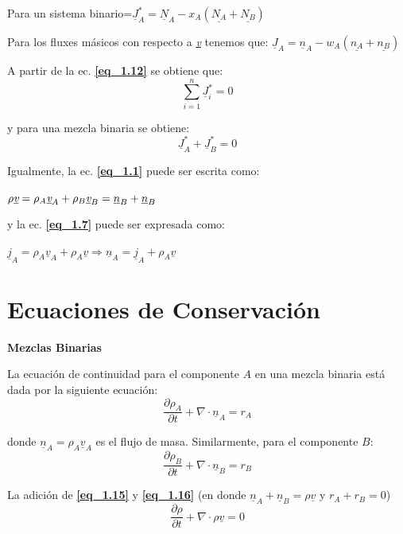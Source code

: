  Para un sistema binario=$\underline{J}_A^*=\underline{N}_A-x_A (\underline{N_A}+\underline{N_B})$
 
 Para los fluxes másicos con respecto a \underline{\emph{v}} tenemos que: $\underline{J}_A=\underline{n}_A-w_A (\underline{n_A}+\underline{n_B})$

 A partir de la ec. \textbf{\eqref{eq_1.12}} se obtiene que:
 \begin{equation}
 	\sum_{i=1}^n \underline{J}_i^* =0 \tag{1.13}\label{eq_1.13}
 \end{equation}
 
 y para una mezcla binaria se obtiene:
 \begin{equation}
 	\underline{J}_A^* + \underline{J}_B^* = 0 \tag{1.14}\label{eq_1.14}
 \end{equation}
 
 Igualmente, la ec. \textbf{\eqref{eq_1.1}} puede ser escrita como:	
 
$\rho \underline{\emph{v}}=\rho_A \underline{\emph{v}}_A+\rho_B \underline{\emph{v}}_B=\underline{n}_B+\underline{n}_B$
 
 y la ec. \textbf{\eqref{eq_1.7}} puede ser expresada como:
 
 $ \underline{j}_A=	\rho_A \underline{v}_A + \rho_A \underline{v} \Rightarrow \underline{n}_A = \underline{j}_A + \rho_A \underline{v} $
 
 \section{Ecuaciones de Conservación}
 \textbf{Mezclas Binarias}
 
 La ecuación de continuidad para el componente $A$ en una mezcla binaria está dada por la siguiente ecuación:
 \begin{equation}
 	\frac{\partial \rho_A}{\partial t} + \nabla \cdot \underline{n}_A = r_A \tag{1.15}\label{eq_1.15}
 \end{equation}
 
 donde $\underline{n}_A=\rho_A \underline{v}_A$ es el flujo de masa.		 Similarmente, para el componente $B$:
 \begin{equation}
 	\frac{\partial \rho_B}{\partial t} + \nabla \cdot \underline{n}_B = r_B \tag{1.16}\label{eq_1.16}
 \end{equation}
 
 La adición de \textbf{\eqref{eq_1.15}} y \textbf{\eqref{eq_1.16}} (en donde  $\underline{n}_A + \underline{n}_B = \rho \underline{v}$ y $r_A + r_B = 0$)
 \begin{equation}
 	\frac{\partial \rho}{\partial t} + \nabla \cdot \rho \underline{v} = 0 \tag{1.17} \label{eq_1.17}
 \end{equation}
 
